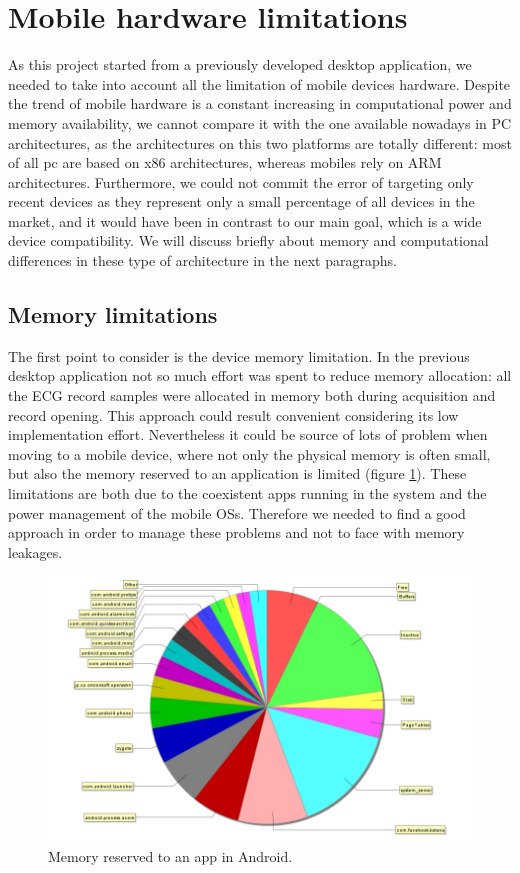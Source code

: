 \section{Mobile hardware limitations}
As this project started from a previously developed desktop application, we needed to take into account all the limitation of mobile devices hardware. Despite the trend of mobile hardware is a constant increasing in computational power and memory availability, we cannot compare it with the one available nowadays in PC architectures, as the architectures on this two platforms are totally different: most of all pc are based on x86 architectures, whereas mobiles rely on ARM architectures. Furthermore, we could not commit the error of targeting only recent devices as they represent only a small percentage of all devices in the market, and it would have been in contrast to our main goal, which is a wide device compatibility.  We will discuss briefly about memory and computational differences in these type of architecture in the next paragraphs.

\subsection{Memory limitations}
The first point to consider is the device memory limitation. In the previous desktop application not so much effort was spent to reduce memory allocation: all the ECG record samples were allocated in memory both during acquisition and record opening. This approach could result convenient considering its low implementation effort. Nevertheless it could be source of lots of problem when moving to a mobile device, where not only the physical memory is often small, but also the memory reserved to an application is limited (figure \ref{fig6.4}). These limitations are both due to the coexistent apps running in the system and the power management of the mobile OSs. Therefore we needed to find a good approach in order to manage these problems and not to face with memory leakages.
\begin{figure}[ht!]
	\centering
	\includegraphics[width=120mm]{figures/ch6/4.png}
	\caption{Memory reserved to an app in Android.}
	\label{fig6.4}
\end{figure}

